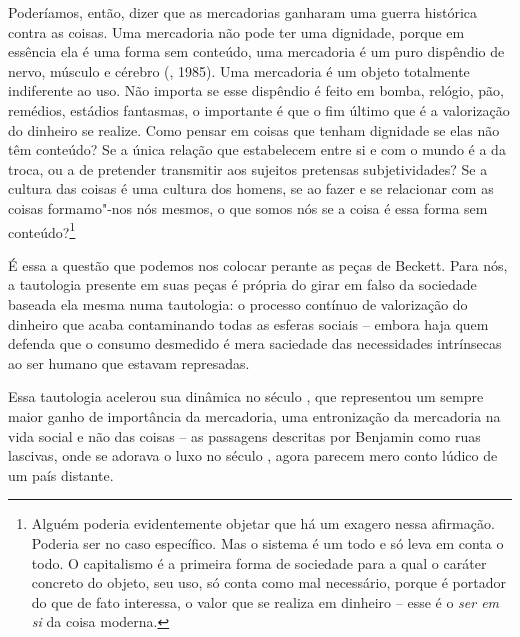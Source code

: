{Poderíamos, então, dizer que as mercadorias ganharam uma guerra
histórica contra as coisas. Uma mercadoria não pode ter uma dignidade,
porque em essência ela é uma forma sem conteúdo, uma mercadoria é um
puro dispêndio de nervo, músculo e cérebro (, 1985). Uma mercadoria
é um objeto totalmente indiferente ao uso. Não importa se esse dispêndio
é feito em bomba, relógio, pão, remédios, estádios fantasmas, o
importante é que o fim último que é a valorização do dinheiro se
realize. Como pensar em coisas que tenham dignidade se elas não têm
conteúdo? Se a única relação que estabelecem entre si e com o mundo é a
da troca, ou a de pretender transmitir aos sujeitos pretensas
subjetividades? Se a cultura das coisas é uma cultura dos homens, se ao
fazer e se relacionar com as coisas formamo"-nos nós mesmos, o que somos
nós se a coisa é essa forma sem conteúdo?\footnote{Alguém poderia
  evidentemente objetar que há um exagero nessa afirmação. Poderia ser
  no caso específico. Mas o sistema é um todo e só leva em conta o todo.
  O capitalismo é a primeira forma de sociedade para a qual o caráter
  concreto do objeto, seu uso, só conta como mal necessário, porque é
  portador do que de fato interessa, o valor que se realiza em dinheiro
  -- esse é o \emph{ser em si} da coisa moderna.}

É essa a questão que podemos nos colocar perante as peças de Beckett.
Para nós, a tautologia presente em suas peças é própria do girar em
falso da sociedade baseada ela mesma numa tautologia: o processo
contínuo de valorização do dinheiro que acaba contaminando todas as
esferas sociais -- embora haja quem defenda que o consumo desmedido é
mera saciedade das necessidades intrínsecas ao ser humano que estavam
represadas.

Essa tautologia acelerou sua dinâmica no século , que representou um
sempre maior ganho de importância da mercadoria, uma entronização da
mercadoria na vida social e não das coisas -- as passagens descritas por
Benjamin como ruas lascivas, onde se adorava o luxo no século , agora
parecem mero conto lúdico de um país distante.

}

